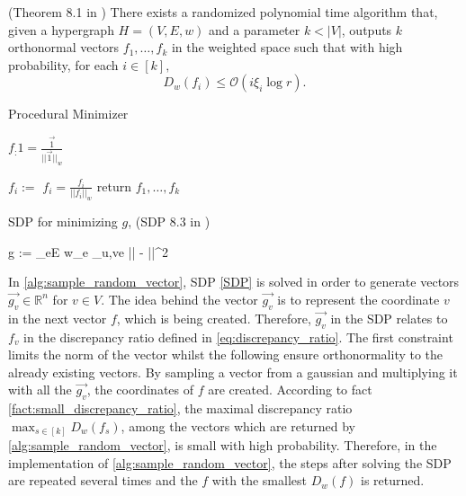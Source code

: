\begin{fact}{(Theorem 8.1 in \cite{ChanLTZ16}) \label{fact:small_discrepancy_ratio}}
	There exists a randomized polynomial time algorithm that, given a hypergraph $H = (V,E,w)$ and a parameter $ k < |V |$, outputs $k$ orthonormal vectors $f_1, \ldots , f_k$ in the weighted space such that with high probability, for each $i  \in [k],$
	\begin{equation}
	D_w(f_i) \le \mathcal{O} (i \xi_i \log r  ) .
	\end{equation}	
\end{fact}

 
\begin{algorithm}[htpb]
	\caption{Procedural Minimizer \label{alg:procedural_minimizer}} 
	\begin{algorithmic}
		\State $f_:1= \frac{\vec{1}}{||\vec{1}||_w}$
		
		\State $f_i := $
		\State $f_i = \frac{f_i}{||f_i||_w}$
		\EndFor
		\State return $f_1, \ldots , f_k$
		\EndFunction 
	\end{algorithmic}
\end{algorithm}	




\begin{sdp}{SDP for minimizing $g$, (SDP 8.3 in \cite{ChanLTZ16}) \label{SDP}} %
	\begin{mini*}
		{g}{ := \sum_{e\in E} w_e \max_{u,v\in e} || - ||^2}{}{}
	\end{mini*}
\end{sdp}


In \cref{alg:sample_random_vector}, SDP \ref{SDP} is solved in order to generate vectors $\vec{g_v} \in \mathbb{R}^n $ for $v \in V$. The idea behind the vector $\vec{g_v}$ is to represent the coordinate $v$ in the next vector $f$, which is being created. Therefore, $\vec{g_v} $ in the SDP relates to $f_v $ in the discrepancy ratio defined in \cref{eq:discrepancy_ratio}. The first constraint limits the norm of the vector whilst the following ensure orthonormality to the already existing vectors. By sampling a vector from a gaussian and multiplying it with all the $\vec{g_v}$, the coordinates of $f$ are created. According to fact \ref{fact:small_discrepancy_ratio}, the maximal discrepancy ratio $ \max_{s \in [k]} D_w(f_s)$, among the vectors which are returned by \cref{alg:sample_random_vector}, is small with high probability. Therefore, in the implementation of \cref{alg:sample_random_vector}, the steps after solving the SDP are repeated several times and the $f$ with the smallest $D_w(f)$ is returned.



